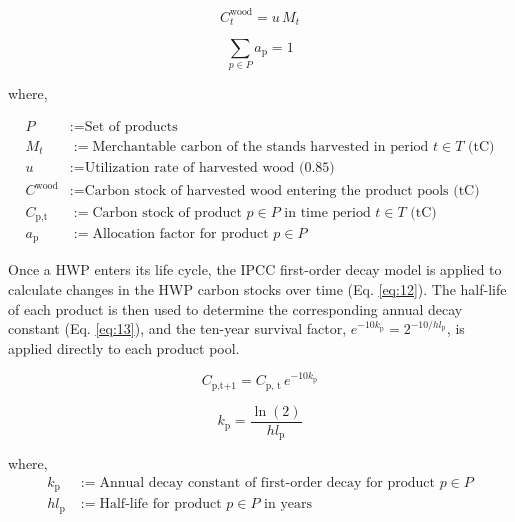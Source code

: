\documentclass[preprint,12pt,authoryear]{elsarticle}
\begin{document}
\begin{linenumbers}
\begin{equation}
C_t^{\text{wood}} = u \, M_t
\label{eq:10}
\end{equation}

\begin{equation}
\sum_{p \in P}a_{\text{p}} = 1
\label{eq:11}
\end{equation}

where,

\begin{align*}
    P &:= \text{Set of products} \\
    M_t &:= \text{Merchantable carbon of the stands harvested in period $t \in T$ (tC)} \\
    u &:= \text{Utilization rate of harvested wood (0.85)} \\
    C^{\text{wood}} &:= \text{Carbon stock of harvested wood entering the product pools (tC)} \\
    C_{\text{p,t}} &:= \text{Carbon stock of product $p \in P$ in time period $t \in T$ (tC)} \\
    a_{\text{p}} &:= \text{Allocation factor for product $p \in P$}
\end{align*}

Once a \ac{HWP} enters its life cycle, the \ac{IPCC} first-order decay model \citep{eggleston2006ipcc} is applied to calculate changes in the \ac{HWP} carbon stocks over time  (Eq. \ref{eq:12}). The half-life of each product is then used to determine the corresponding annual decay constant (Eq. \ref{eq:13}), and the ten-year survival factor, $e^{-10 k_{\text{p}}} = 2^{-10/hl_{\text{p}}}$, is applied directly to each product pool.

\begin{equation}
C_{\text{p,t+1}} = C_{\text{p, t}} \, e^{-10 k_{\text{p}}}
\label{eq:12}
\end{equation}

\begin{equation}
k_{\text{p}} = \frac{\ln(2)}{hl_{\text{p}}}
\label{eq:13}
\end{equation}

where,
\begin{align*}
    k_{\text{p}} &:= \text{Annual decay constant of first-order decay for product $p \in P$} \\
    hl_{\text{p}} &:= \text{Half-life for product $p \in P$ in years} \end{align*}



\end{linenumbers}
\end{document}
